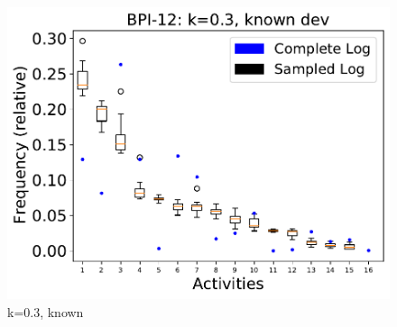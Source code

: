 \documentclass[landscape]{article}
\begin{document}
\begin{figure}[!htb]
\begin{minipage}{0.2\textwidth}
		\includegraphics[width=1.0\textwidth]{../BPI_Challenge_2012/BPI_Challenge_2012_deviationsApprox_0.3_NONALIGNING_KNOWN.pdf}
		\caption{k=0.3, known}
	\end{minipage}
\end{figure}
\end{document}

